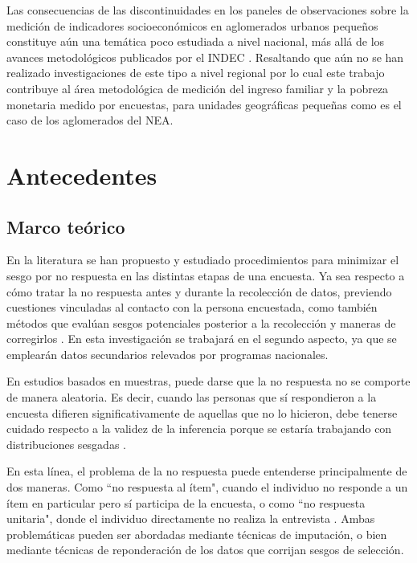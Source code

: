 \documentclass{article}
\begin{document}
Las consecuencias de las discontinuidades en los paneles de observaciones sobre la medición de indicadores socioeconómicos en aglomerados urbanos pequeños constituye aún una temática poco estudiada a nivel nacional, más allá de los avances metodológicos publicados por el INDEC \cite{indecmetod}. Resaltando que aún no se han realizado investigaciones de este tipo a nivel regional por lo cual este trabajo contribuye al área metodológica de medición del ingreso familiar y la pobreza monetaria medido por encuestas, para unidades geográficas pequeñas como es el caso de los aglomerados del NEA.

\section{Antecedentes}

\subsection{Marco teórico}

En la literatura se han propuesto y estudiado procedimientos para minimizar el sesgo por no respuesta en las distintas etapas de una encuesta. Ya sea respecto a cómo tratar la no respuesta antes y durante la recolección de datos, previendo cuestiones vinculadas al contacto con la persona encuestada, como también métodos que evalúan sesgos potenciales posterior a la recolección y maneras de corregirlos \cite{plansurvey05}. En esta investigación se trabajará en el segundo aspecto, ya que se emplearán datos secundarios relevados por programas nacionales.

En estudios basados en muestras, puede darse que la no respuesta no se comporte de manera aleatoria. Es decir, cuando las personas que sí respondieron a la encuesta difieren significativamente de aquellas que no lo hicieron, debe tenerse cuidado respecto a la validez de la inferencia porque se estaría trabajando con distribuciones sesgadas \cite{wmethods}.

En esta línea, el problema de la no respuesta puede entenderse principalmente de dos maneras. Como ``no respuesta al ítem", cuando el individuo no responde a un ítem en particular pero sí participa de la encuesta, o como ``no respuesta unitaria", donde el individuo directamente no realiza la entrevista \cite{korinek07}. Ambas problemáticas pueden ser abordadas mediante técnicas de imputación, o bien mediante técnicas de reponderación de los datos que corrijan sesgos de selección.
\end{document}

